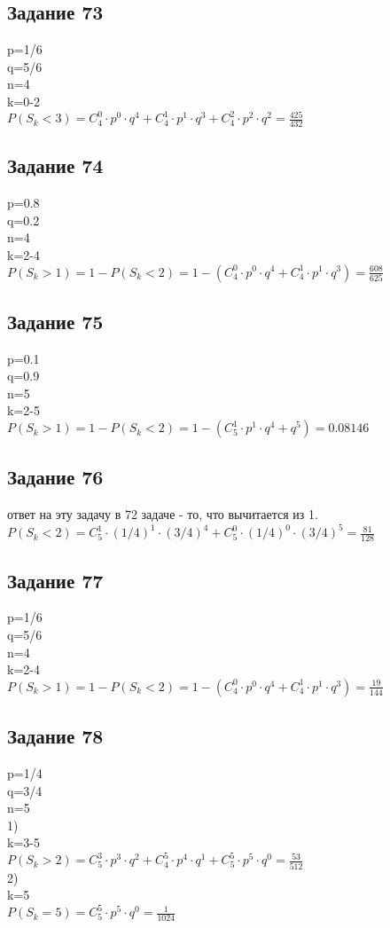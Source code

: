 \documentclass[12pt]{article}
\begin{document}
\subsection{Задание 73}
p=1/6\\
q=5/6\\
n=4\\
k=0-2\\
$
P(S_k<3)=C_{4}^{0}\cdot p^0\cdot q^4 + C_{4}^{1}\cdot p^1\cdot q^3  + C_{4}^{2}\cdot p^2\cdot q^2=  \frac{425}{432} 
$
\newpage
\subsection{Задание 74}
p=0.8\\
q=0.2\\
n=4\\
k=2-4\\
$
P(S_k>1)=1-P(S_k<2)=1-(C_{4}^{0}\cdot p^0\cdot q^4 + C_{4}^{1}\cdot p^1\cdot q^3) =  \frac{608}{625} 
$
\newpage
\subsection{Задание 75}
p=0.1\\
q=0.9\\
n=5\\
k=2-5\\
$
P(S_k>1)=1-P(S_k<2)=1-(C_{5}^{1}\cdot p^1\cdot q^4 + q^5) =  0.08146
$
\newpage
\subsection{Задание 76}
ответ на эту задачу в 72 задаче - то, что вычитается из 1.\\
$
P(S_k<2)=C_{5}^{1}\cdot (1/4)^1\cdot (3/4)^4 + C_{5}^{0}\cdot (1/4)^0\cdot (3/4)^5=\frac{81}{128}
$
\newpage
\subsection{Задание 77}
p=1/6\\
q=5/6\\
n=4\\
k=2-4\\
$
P(S_k>1)=1-P(S_k<2)=1-(C_{4}^{0}\cdot p^0\cdot q^4 + C_{4}^{1}\cdot p^1\cdot q^3) =  \frac{19}{144} 
$
\newpage
\subsection{Задание 78}
p=1/4\\
q=3/4\\
n=5\\
1)\\
k=3-5\\
$
P(S_k>2)=C_{5}^{3}\cdot p^3\cdot q^2 + C_{4}^{5}\cdot p^4\cdot q^1+ C_{5}^{5}\cdot p^5\cdot q^0 =  \frac{53}{512} 
$\\
2)\\
k=5\\
$
P(S_k=5)=C_{5}^{5}\cdot p^5\cdot q^0=  \frac{1}{1024} 
$
\newpage
\end{document}

